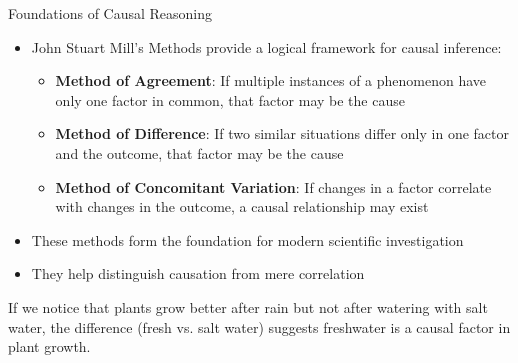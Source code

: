 \documentclass{beamer}
\begin{document}
\begin{frame}{Foundations of Causal Reasoning}
    \begin{itemize}
        \item John Stuart Mill's Methods provide a logical framework for causal inference:
            \begin{itemize}
                \item \textbf{Method of Agreement}: If multiple instances of a phenomenon have only one factor in common, that factor may be the cause
                \item \textbf{Method of Difference}: If two similar situations differ only in one factor and the outcome, that factor may be the cause
                \item \textbf{Method of Concomitant Variation}: If changes in a factor correlate with changes in the outcome, a causal relationship may exist
            \end{itemize}
        \item These methods form the foundation for modern scientific investigation
        \item They help distinguish causation from mere correlation
    \end{itemize}
    
    \begin{example}
        If we notice that plants grow better after rain but not after watering with salt water, the difference (fresh vs. salt water) suggests freshwater is a causal factor in plant growth.
    \end{example}
\end{frame}
\end{document}
